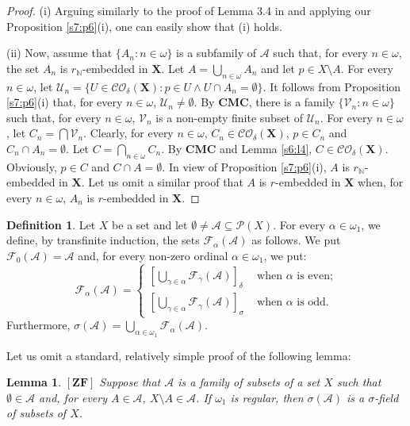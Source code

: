 \documentclass[12pt,twoside,leqno]{article}
\theoremstyle{plain}
\newtheorem{lemma}[theorem]{Lemma}
\theoremstyle{definition}
\newtheorem{definition}[theorem]{Definition}
\theoremstyle{remark}
\begin{document}
\begin{proof}
	(i) Arguing similarly to the proof of Lemma 3.4 in \cite{neg} and applying our Proposition \ref{s7:p6}(i), one can easily show that (i) holds.
	
	(ii) Now, assume that $\{A_n: n\in\omega\}$ is a subfamily of $\mathcal{A}$ such that, for every $n\in\omega$, the set $A_n$ is $r_{\mathbb{N}}$-embedded in $\mathbf{X}$. Let $A=\bigcup\limits_{n\in\omega}A_n$ and let $p\in X\setminus A$. For every $n\in\omega$, let $\mathcal{U}_n=\{U\in \mathcal{CO}_{\delta}(\mathbf{X}): p\in U\wedge U\cap A_n=\emptyset\}$. It follows from Proposition \ref{s7:p6}(i) that, for every $n\in\omega$, $\mathcal{U}_n\neq\emptyset$. By $\mathbf{CMC}$, there is a family $\{\mathcal{V}_n: n\in\omega\}$ such that, for every $n\in\omega$, $\mathcal{V}_n$ is a non-empty finite subset of $\mathcal{U}_n$. For every $n\in\omega$, let $C_n=\bigcap\mathcal{V}_n$. Clearly, for every $n\in\omega$, $C_n\in\mathcal{CO}_{\delta}(\mathbf{X})$, $p\in C_n$ and $C_n\cap A_n=\emptyset$. Let $C=\bigcap\limits_{n\in\omega}C_n$. By $\mathbf{CMC}$ and Lemma \ref{s6:l4}, $C\in\mathcal{CO}_{\delta}(\mathbf{X})$. Obviously, $p\in C$ and $C\cap A=\emptyset$. In view of Proposition \ref{s7:p6}(i), $A$ is $r_{\mathbb{N}}$-embedded in $\mathbf{X}$. Let us omit a similar proof that $A$ is $r$-embedded in $\mathbf{X}$ when, for every $n\in\omega$, $A_n$ is $r$-embedded in $\mathbf{X}$.
\end{proof}

\begin{definition}
	\label{s7:d8}
	Let $X$ be a set and let  $\emptyset\neq \mathcal{A}\subseteq\mathcal{P}(X)$. For every $\alpha\in\omega_1$, we define, by transfinite induction, the sets $\mathcal{F}_{\alpha}(\mathcal{A})$ as follows. We put  $\mathcal{F}_0(\mathcal{A})=\mathcal{A}$ and, for every non-zero ordinal $\alpha\in\omega_1$, we put:
	$$
	\mathcal{F}_{\alpha}(\mathcal{A})=\begin{cases} [\bigcup\limits_{\gamma\in\alpha}\mathcal{F}_{\gamma}(\mathcal{A})]_{\delta} &\text{ when $\alpha$ is even;}\\
		[\bigcup\limits_{\gamma\in\alpha} \mathcal{F}_{\gamma}(\mathcal{A})]_{\sigma} &\text{ when $\alpha$ is odd.}\end{cases}
	$$
	Furthermore, $\sigma(\mathcal{A})=\bigcup\limits_{\alpha\in\omega_1}\mathcal{F}_{\alpha}(\mathcal{A})$.
\end{definition}

Let us omit a standard, relatively simple proof of the following lemma:
\begin{lemma}
	\label{s7:l9}
	$[\mathbf{ZF}]$ Suppose that $\mathcal{A}$ is a family of subsets of a set $X$ such that $\emptyset\in \mathcal{A}$ and, for every $A\in\mathcal{A}$, $X\setminus A\in\mathcal{A}$. If $\omega_1$ is regular, then $\sigma(\mathcal{A})$ is a $\sigma$-field of subsets of $X$.
\end{lemma}
\end{document}
